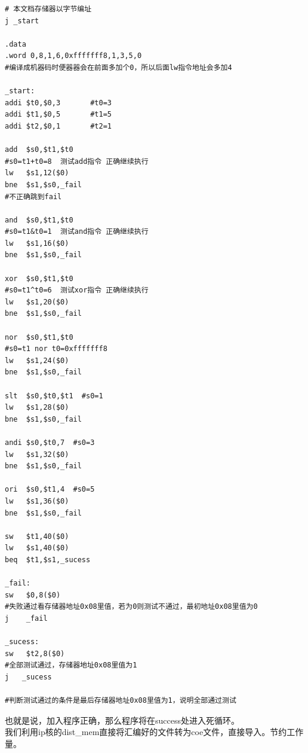 \documentclass[12pt, a4paper]{article}
\begin{document}
\lstset {style=MIPS}
\begin{lstlisting}
# 本文档存储器以字节编址
j _start

.data
.word 0,8,1,6,0xfffffff8,1,3,5,0
#编译成机器码时便器器会在前面多加个0，所以后面lw指令地址会多加4

_start:    
addi $t0,$0,3       #t0=3 
addi $t1,$0,5   	#t1=5 
addi $t2,$0,1       #t2=1 

add  $s0,$t1,$t0
#s0=t1+t0=8  测试add指令 正确继续执行 
lw   $s1,12($0)   
bne  $s1,$s0,_fail
#不正确跳到fail  

and  $s0,$t1,$t0
#s0=t1&t0=1  测试and指令 正确继续执行 
lw   $s1,16($0)   
bne  $s1,$s0,_fail 

xor  $s0,$t1,$t0
#s0=t1^t0=6  测试xor指令 正确继续执行 
lw   $s1,20($0)   
bne  $s1,$s0,_fail 

nor  $s0,$t1,$t0
#s0=t1 nor t0=0xfffffff8 
lw   $s1,24($0)   
bne  $s1,$s0,_fail 

slt  $s0,$t0,$t1  #s0=1 
lw   $s1,28($0)   
bne  $s1,$s0,_fail 

andi $s0,$t0,7  #s0=3 
lw   $s1,32($0)  
bne  $s1,$s0,_fail 

ori  $s0,$t1,4  #s0=5 
lw   $s1,36($0)  
bne  $s1,$s0,_fail 

sw   $t1,40($0) 
lw   $s1,40($0) 
beq  $t1,$s1,_sucess 

_fail:  
sw   $0,8($0)
#失败通过看存储器地址0x08里值，若为0则测试不通过，最初地址0x08里值为0 
j    _fail 

_sucess: 
sw   $t2,8($0)
#全部测试通过，存储器地址0x08里值为1 
j   _sucess       

#判断测试通过的条件是最后存储器地址0x08里值为1，说明全部通过测试
\end{lstlisting}
也就是说，加入程序正确，那么程序将在success处进入死循环。\\
我们利用ip核的dist\_mem直接将汇编好的文件转为coe文件，直接导入。节约工作量。
\end{document}
